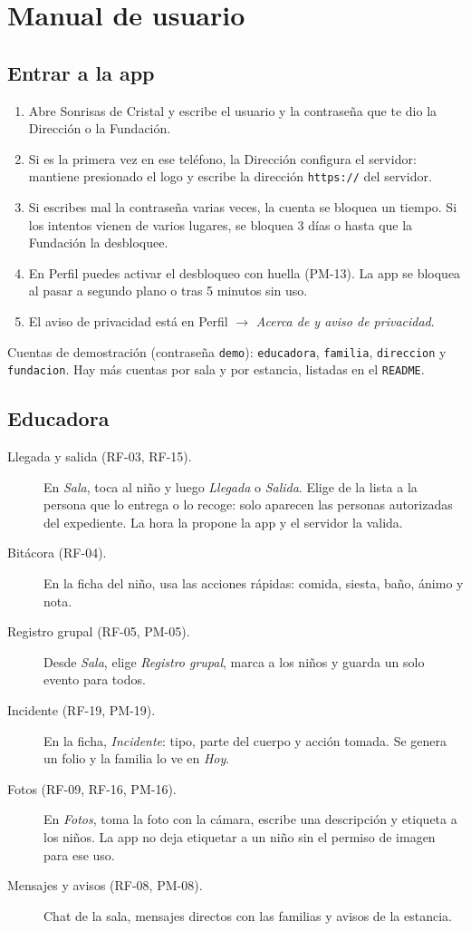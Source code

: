 \section{Manual de usuario}\label{sec:manual}

\subsection{Entrar a la app}
\begin{enumerate}
	\item Abre Sonrisas de Cristal y escribe el usuario y la contraseña que te dio la Dirección o la Fundación.
	\item Si es la primera vez en ese teléfono, la Dirección configura el servidor: mantiene presionado el logo y escribe la dirección \texttt{https:/\allowbreak{}/\allowbreak{}} del servidor.
	\item Si escribes mal la contraseña varias veces, la cuenta se bloquea un tiempo. Si los intentos vienen de varios lugares, se bloquea 3 días o hasta que la Fundación la desbloquee.
	\item En Perfil puedes activar el desbloqueo con huella (PM-13). La app se bloquea al pasar a segundo plano o tras 5 minutos sin uso.
	\item El aviso de privacidad está en Perfil $\rightarrow$ \emph{Acerca de y aviso de privacidad}.
\end{enumerate}

Cuentas de demostración (contraseña \texttt{demo}): \texttt{educadora}, \texttt{familia}, \texttt{direccion} y \texttt{fundacion}. Hay más cuentas por sala y por estancia, listadas en el \texttt{README}.

\subsection{Educadora}
\begin{description}
	\item[Llegada y salida (RF-03, RF-15).] En \emph{Sala}, toca al niño y luego \emph{Llegada} o \emph{Salida}. Elige de la lista a la persona que lo entrega o lo recoge: solo aparecen las personas autorizadas del expediente. La hora la propone la app y el servidor la valida.
	\item[Bitácora (RF-04).] En la ficha del niño, usa las acciones rápidas: comida, siesta, baño, ánimo y nota.
	\item[Registro grupal (RF-05, PM-05).] Desde \emph{Sala}, elige \emph{Registro grupal}, marca a los niños y guarda un solo evento para todos.
	\item[Incidente (RF-19, PM-19).] En la ficha, \emph{Incidente}: tipo, parte del cuerpo y acción tomada. Se genera un folio y la familia lo ve en \emph{Hoy}.
	\item[Fotos (RF-09, RF-16, PM-16).] En \emph{Fotos}, toma la foto con la cámara, escribe una descripción y etiqueta a los niños. La app no deja etiquetar a un niño sin el permiso de imagen para ese uso.
	\item[Mensajes y avisos (RF-08, PM-08).] Chat de la sala, mensajes directos con las familias y avisos de la estancia.
\end{description}

